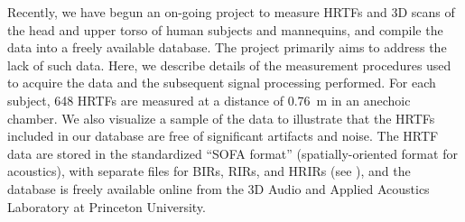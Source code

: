 Recently, we have begun an on-going project to measure HRTFs and 3D scans of the head and upper torso of human subjects and mannequins, and compile the data into a freely available database.
The project primarily aims to address the lack of such data.
Here, we describe details of the measurement procedures used to acquire the data and the subsequent signal processing performed.
For each subject, 648 HRTFs are measured at a distance of 0.76~m in an anechoic chamber.
We also visualize a sample of the data to illustrate that the HRTFs included in our database are free of significant artifacts and noise.
The HRTF data are stored in the standardized ``SOFA format'' (spatially-oriented format for acoustics), with separate files for BIRs, RIRs, and HRIRs (see ), and the database is freely available online from the 3D Audio and Applied Acoustics Laboratory at Princeton University.